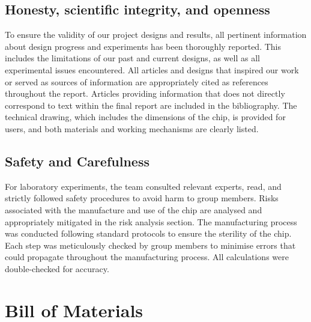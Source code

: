 \documentclass[letterpaper,12pt]{article}
\begin{document}
\subsection*{Honesty, scientific integrity, and openness}

To ensure the validity of our project designs and results, all pertinent information about design progress and experiments has been thoroughly reported. This includes the limitations of our past and current designs, as well as all experimental issues encountered. All articles and designs that inspired our work or served as sources of information are appropriately cited as references throughout the report. Articles providing information that does not directly correspond to text within the final report are included in the bibliography. The technical drawing, which includes the dimensions of the chip, is provided for users, and both materials and working mechanisms are clearly listed.

\subsection*{Safety and Carefulness}

For laboratory experiments, the team consulted relevant experts, read, and strictly followed safety procedures to avoid harm to group members. Risks associated with the manufacture and use of the chip are analysed and appropriately mitigated in the risk analysis section. The manufacturing process was conducted following standard protocols to ensure the sterility of the chip. Each step was meticulously checked by group members to minimise errors that could propagate throughout the manufacturing process. All calculations were double-checked for accuracy.



\newpage



\section{Bill of Materials}
\end{document}
